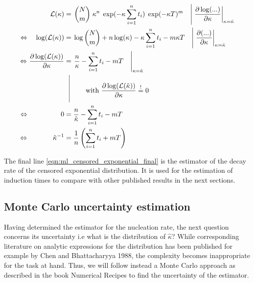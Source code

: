 \begin{align}
\label{eqn:ml_censored_exponential} 
\mathcal{L}(\kappa) & = \left. \binom{N}{m} \;  \kappa^n \; \exp(- \kappa \sum_{i=1}^n t_i) \;  \exp(-\kappa T)^m \quad \right| \left.\frac{\partial \log ( ... )}{\partial \kappa} \right|_{\kappa=\hat{\kappa}} \\
\Leftrightarrow \quad\log ( \mathcal{L}(\kappa)) & = \left.\log\binom{N}{m}  + n \log ( \kappa) - \kappa \sum_{i=1}^n t_i - m \kappa T \quad \right| \left. \frac{\partial(...)}{\partial \kappa} \right|_{\kappa=\hat{\kappa}} \\
\Leftrightarrow \:\! \frac{\partial \log ( \mathcal{L}(\kappa))}{\partial \kappa} & = \left. \frac{n}{ \kappa} - \sum_{i=1}^n t_i - m  T \quad \right|_{\kappa=\hat{\kappa}}\\ 
 & \; \; \, \vrule
  \begin{aligned}[t]
      \raisebox{0.9cm}{ \makebox[0.1cm]{}} \raisebox{-0.5cm}{ \makebox[0.5cm]{}}  \text{with } \frac{\partial \log ( \mathcal{L}(\hat{\kappa})  )}{\partial \kappa}  \stackrel{!}{=} 0  \\
  \end{aligned} \nonumber\\
\Leftrightarrow \qquad\qquad \;\; \:\! 0 &= \frac{n}{ \hat{\kappa}} - \sum_{i=1}^n t_i - m  T \quad\\
\label{eqn:ml_censored_exponential_final}
 \Leftrightarrow \qquad\quad  \;\: \hat{\kappa}^{-1} &= \frac{1}{n} \left(  \sum_{i=1}^n t_i + m T \right)
\end{align}


The final line \autoref{eqn:ml_censored_exponential_final} is the estimator of the decay rate of the censored exponential distribution. It is used for the estimation of induction times to compare with other published results in the next sections.

\subsection{Monte Carlo uncertainty estimation}
\label{sec:mc_uncertainty}
Having determined the estimator for the nucleation rate, the next question concerns its uncertainty i.e what is the distribution of $\hat{\kappa}$? While corresponding literature on analytic expressions for the distribution has been published for example by Chen and Bhattacharyya 1988\cite{Chen1988}, the complexity becomes inappropriate for the task at hand. Thus, we will follow instead a Monte Carlo approach as described in the book Numerical Recipes\cite{Press1992} to find the uncertainty of the estimator.\\

